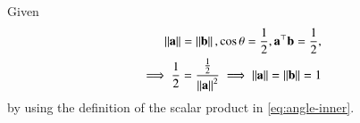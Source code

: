 Given 
\begin{align}
	\left\lVert\mathbf{a}\right\rVert= \left\lVert\mathbf{b}\right\rVert, {\cos\theta} = \frac{1}{2}, 
	\mathbf{a}^{\top}{\mathbf{b}} = \frac{1}{2},  \\
\implies 
	\frac{1}{2} = \frac{\frac{1}{2}}{\left\lVert\mathbf{a}\right\rVert^2}
\implies \left\lVert\mathbf{a}\right\rVert
= \left\lVert\mathbf{b}\right\rVert=1
\end{align}
by using  the definition of the scalar product
	in \eqref{eq:angle-inner}.
